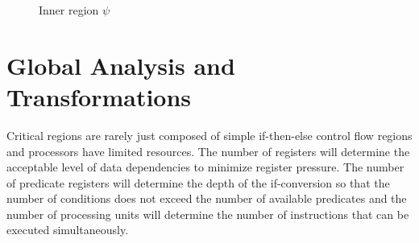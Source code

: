 \begin{figure}
\footnotesize
{}
\caption{Inner region $\psi$}
\end{figure}

\section{Global Analysis and Transformations}
\label{sec:if_conversion:hyperblock}
Critical regions are rarely just composed of simple if-then-else control flow regions and processors have limited resources. The number of registers will determine the acceptable level of data dependencies to minimize register pressure. The number of predicate registers will determine the depth of the if-conversion so that the number of conditions does not exceed the number of available predicates and the number of processing units will determine the number of instructions that can be executed simultaneously. 

